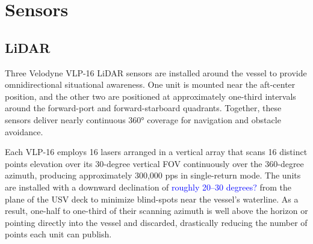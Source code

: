 \documentclass{erauthesis}
\begin{document}
\section{Sensors} \label{sensors}


\subsection{LiDAR} \label{sensors_LiDAR}


Three Velodyne VLP-16 \ac{LiDAR} sensors are installed around the vessel to provide omnidirectional situational awareness. 
One unit is mounted near the aft-center position, and the other two are positioned at approximately one-third intervals around the forward-port and forward-starboard quadrants. 
Together, these sensors deliver nearly continuous 360° coverage for navigation and obstacle avoidance.

Each VLP-16 employs 16 lasers arranged in a vertical array that scans 16 distinct points elevation over its 30-degree vertical \ac{FOV} continuously over the 360-degree azimuth, producing approximately 300,000 \ac{pps} in single-return mode. 
The units are installed with a downward declination of \textcolor{blue}{roughly 20–30 degrees?} from the plane of the \ac{USV} deck to minimize blind-spots near the vessel's waterline.
As a result, one-half to one-third of their scanning azimuth is well above the horizon or pointing directly into the vessel and discarded, drastically reducing the number of points each unit can publish.
\end{document}
